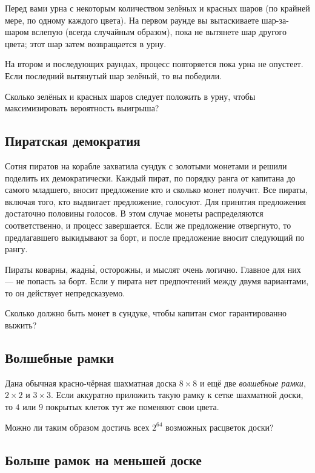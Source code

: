 Перед вами урна с некоторым количеством зелёных и красных шаров (по крайней мере, по одному каждого цвета).
На первом раунде вы вытаскиваете шар-за-шаром вслепую (всегда случайным образом), пока не вытянете шар другого цвета; этот шар затем возвращается в урну.

На втором и последующих раундах, процесс повторяется пока урна не опустеет.
Если последний вытянутый шар зелёный, то вы победили.

Сколько зелёных и красных шаров следует положить в урну, чтобы максимизировать вероятность выигрыша?

\subsection*{Пиратская демократия}

Сотня пиратов на корабле захватила сундук с золотыми монетами и решили поделить их демократически.
Каждый пират, по порядку ранга от капитана до самого младшего, вносит предложение кто и сколько монет получит.
Все пираты, включая того, кто выдвигает предложение, голосуют.
Для принятия предложения достаточно половины голосов.
В этом случае монеты распределяются соответственно, и процесс завершается.
Если же предложение отвергнуто, то предлагавшего выкидывают за борт, и после предложение вносит следующий по рангу.

Пираты коварны, жадн\'{ы}, осторожны, и мыслят очень логично.
Главное для них --- не попасть за борт.
Если у пирата нет предпочтений между двумя вариантами, то он действует непредсказуемо.

Сколько должно быть монет в сундуке, чтобы капитан смог гарантированно выжить?

\subsection*{Волшебные рамки}

Дана обычная красно-чёрная шахматная доска $8 \times 8$ и ещё две \emph{волшебные рамки},  $2 \times 2$ и $3 \times 3$.
Если аккуратно приложить такую рамку к сетке шахматной доски, то $4$ или $9$ покрытых клеток тут же поменяют свои цвета.

Можно ли таким образом достичь всех $2^{64}$ возможных расцветок доски?

\subsection*{Больше рамок на меньшей доске}

